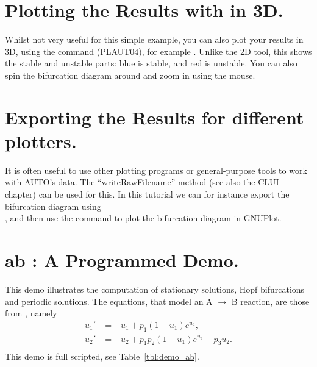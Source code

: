 \documentclass[12pt]{report}
\begin{document}
\section{ Plotting the Results with \AUTO in 3D.}
Whilst not very useful for this simple example, you can also plot
your results in 3D, using the  command (PLAUT04), for example
. Unlike the 2D tool, this shows the stable and
unstable parts: blue is stable, and red is unstable. You can also
spin the bifurcation diagram around and zoom in using the mouse.

\section{ Exporting the Results for different plotters.}
It is often useful to use other plotting programs or general-purpose
tools to work with AUTO's data. The ``writeRawFilename'' method (see
also the CLUI chapter) can be used for this. In this tutorial we can for
instance export the bifurcation diagram using\\
, and then use
the command  to plot
the bifurcation diagram in GNUPlot.

\section{ ab : A Programmed Demo.} \label{sec:Demos_ab}
This demo illustrates the computation of 
stationary solutions,
Hopf bifurcations 
and 
periodic solutions.
The equations, that model an A $\to$ B  reaction, are those from
 \citeyear{URP:74}, namely
\begin{equation} \begin{array}{cl}
  u_1 ' &=  -u_1 + p_1 (1-u_1) e^{u_2}, \\
  u_2 ' &=  -u_2 +  p_1 p_2 ( 1-u_1) e^{u_2} - p_3 u_2.\\
\end{array} \end{equation}
This demo is full scripted, see Table~\ref{tbl:demo_ab}.
\end{document}

